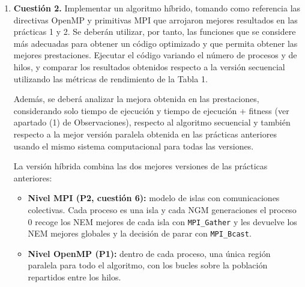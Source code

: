 \documentclass[12pt]{article}
\begin{document}
\begin{enumerate}
\vspace{0.5cm}

\medskip
\noindent\textbf{Inicialización de la semilla (\texttt{aplicar\_mh} en \texttt{mh.c})}\par
\smallskip

\begin{lstlisting}[style=EstiloC]
// P3 CUESTIÓN 1: en lugar de srand se inicializa la semilla de rand_r
semilla = (unsigned int) (time(NULL) + getpid() + rank * 1000);
\end{lstlisting}

\textbf{Justificación:} Sustituye al \texttt{srand} de la P2. Se mantiene el \texttt{rank} para que cada isla tenga una semilla distinta y evolucione de forma diferente. En esta cuestión todavía no hay hilos, así que hay una semilla por proceso; en la cuestión 2 se añade el número de hilo para que cada hilo de cada proceso tenga la suya. En el \texttt{Makefile} se ha añadido \texttt{-fopenmp} para que se reconozca la directiva \texttt{threadprivate}. La corrección se ha comprobado verificando los genes de las soluciones y recalculando su fitness. Cambiar el generador puede cambiar la secuencia aleatoria y el fitness final respecto a P2.


\newpage
\item \textbf{Cuestión 2.} Implementar un algoritmo híbrido, tomando como referencia las directivas OpenMP y primitivas MPI que arrojaron mejores resultados en las prácticas 1 y 2. Se deberán utilizar, por tanto, las funciones que se considere más adecuadas para obtener un código optimizado y que permita obtener las mejores prestaciones. Ejecutar el código variando el número de procesos y de hilos, y comparar los resultados obtenidos respecto a la versión secuencial utilizando las métricas de rendimiento de la Tabla 1.

Además, se deberá analizar la mejora obtenida en las prestaciones, considerando solo tiempo de ejecución y tiempo de ejecución + fitness (ver apartado (1) de Observaciones), respecto al algoritmo secuencial y también respecto a la mejor versión paralela obtenida en las prácticas anteriores usando el mismo sistema computacional para todas las versiones.


La versión híbrida combina las dos mejores versiones de las prácticas anteriores:

\begin{itemize}
    \item \textbf{Nivel MPI (P2, cuestión 6):} modelo de islas con comunicaciones colectivas. Cada proceso es una isla y cada NGM generaciones el proceso 0 recoge los NEM mejores de cada isla con \texttt{MPI\_Gather} y les devuelve los NEM mejores globales y la decisión de parar con \texttt{MPI\_Bcast}.
    \item \textbf{Nivel OpenMP (P1):} dentro de cada proceso, una única región paralela para todo el algoritmo, con los bucles sobre la población repartidos entre los hilos.
\end{itemize}


\end{enumerate}
\end{document}
